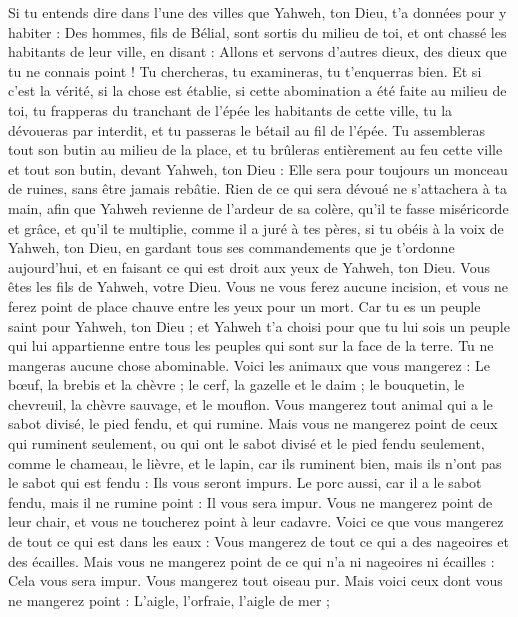 \begin{multicols}{2}
Si tu entends dire dans l'une des villes que Yahweh, ton Dieu, t’a données pour y habiter :
Des hommes, fils de Bélial, sont sortis du milieu de toi, et ont chassé les habitants de leur ville, en disant : Allons et servons d'autres dieux, des dieux que tu ne connais point !
Tu chercheras, tu examineras, tu t’enquerras bien. Et si c’est la vérité, si la chose est établie, si cette abomination a été faite au milieu de toi,
tu frapperas du tranchant de l'épée les habitants de cette ville, tu la dévoueras par interdit, et tu passeras le bétail au fil de l'épée.
Tu assembleras tout son butin au milieu de la place, et tu brûleras entièrement au feu cette ville et tout son butin, devant Yahweh, ton Dieu : Elle sera pour toujours un monceau de ruines, sans être jamais rebâtie.
Rien de ce qui sera dévoué ne s’attachera à ta main, afin que Yahweh revienne de l’ardeur de sa colère, qu'il te fasse miséricorde et grâce, et qu'il te multiplie, comme il a juré à tes pères,
si tu obéis à la voix de Yahweh, ton Dieu, en gardant tous ses commandements que je t’ordonne aujourd'hui, et en faisant ce qui est droit aux yeux de Yahweh, ton Dieu.
\VerseOne{}Vous êtes les fils de Yahweh, votre Dieu. Vous ne vous ferez aucune incision, et vous ne ferez point de place chauve entre les yeux pour un mort.
Car tu es un peuple saint pour Yahweh, ton Dieu ; et Yahweh t'a choisi pour que tu lui sois un peuple qui lui appartienne entre tous les peuples qui sont sur la face de la terre.
Tu ne mangeras aucune chose abominable.
Voici les animaux que vous mangerez : Le bœuf, la brebis et la chèvre ;
le cerf, la gazelle et le daim ; le bouquetin, le chevreuil, la chèvre sauvage, et le mouflon.
Vous mangerez tout animal qui a le sabot divisé, le pied fendu, et qui rumine.
Mais vous ne mangerez point de ceux qui ruminent seulement, ou qui ont le sabot divisé et le pied fendu seulement, comme le chameau, le lièvre, et le lapin, car ils ruminent bien, mais ils n'ont pas le sabot qui est fendu : Ils vous seront impurs.
Le porc aussi, car il a le sabot fendu, mais il ne rumine point : Il vous sera impur. Vous ne mangerez point de leur chair, et vous ne toucherez point à leur cadavre.
Voici ce que vous mangerez de tout ce qui est dans les eaux : Vous mangerez de tout ce qui a des nageoires et des écailles.
Mais vous ne mangerez point de ce qui n'a ni nageoires ni écailles : Cela vous sera impur.
Vous mangerez tout oiseau pur.
Mais voici ceux dont vous ne mangerez point : L'aigle, l'orfraie, l’aigle de mer ;

\end{multicols}
